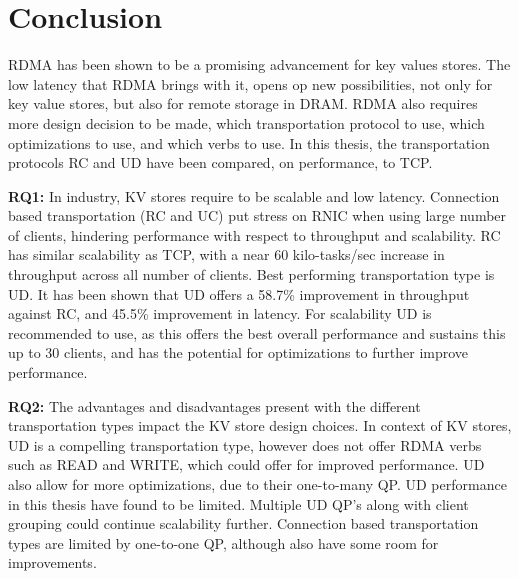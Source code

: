 
\chapter{Conclusion}\label{ch:conclusion} %



\ifpdf
    \graphicspath{{7/figures/PNG/}{7/figures/PDF/}{7/figures/}}
\else
    \graphicspath{{7/figures/EPS/}{7/figures/}}
\fi


%
RDMA has been shown to be a promising advancement for key values stores.
The low latency that RDMA brings with it, opens op new possibilities, not only for key value stores, but also for remote storage in DRAM.
RDMA also requires more design decision to be made, which transportation protocol to use, which optimizations to use, and which verbs to use.
In this thesis, the transportation protocols RC and UD have been compared, on performance, to TCP.

\textbf{RQ1:} In industry, KV stores require to be scalable and low latency.
Connection based transportation (RC and UC) put stress on RNIC when using large number of clients, hindering performance with respect to throughput and scalability.
RC has similar scalability as TCP, with a near 60 kilo-tasks/sec increase in throughput across all number of clients.
Best performing transportation type is UD.
It has been shown that UD offers a 58.7\% improvement in throughput against RC, and 45.5\% improvement in latency.
For scalability UD is recommended to use, as this offers the best overall performance and sustains this up to 30 clients, and has the potential for optimizations to further improve performance.

\textbf{RQ2:} The advantages and disadvantages present with the different transportation types impact the KV store design choices.
In context of KV stores, UD is a compelling transportation type, however does not offer RDMA verbs such as READ and WRITE, which could offer for improved performance.
UD also allow for more optimizations, due to their one-to-many QP.
UD performance in this thesis have found to be limited.
Multiple UD QP's along with client grouping could continue scalability further.
Connection based transportation types are limited by one-to-one QP, although also have some room for improvements.


